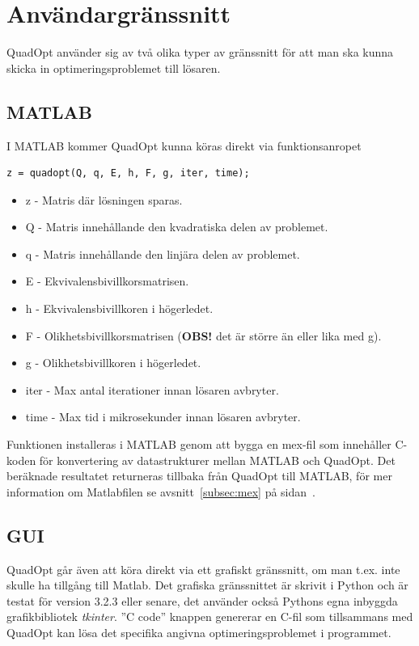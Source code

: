 \section{Användargränssnitt}
QuadOpt använder sig av två olika typer av gränssnitt för att man ska kunna skicka in optimeringsproblemet till lösaren.

\subsection{MATLAB}
I MATLAB kommer QuadOpt kunna köras direkt via funktionsanropet

\begin{lstlisting}
z = quadopt(Q, q, E, h, F, g, iter, time);
\end{lstlisting}

\begin{itemize}
	\item z - Matris där lösningen sparas.
	\item Q - Matris innehållande den kvadratiska delen av problemet.
	\item q - Matris innehållande den linjära delen av problemet.
	\item E - Ekvivalensbivillkorsmatrisen.
	\item h - Ekvivalensbivillkoren i högerledet.
	\item F - Olikhetsbivillkorsmatrisen (\textbf{OBS!} det är större än eller lika med g).
	\item g - Olikhetsbivillkoren i högerledet.
	\item iter - Max antal iterationer innan lösaren avbryter.
	\item time - Max tid i mikrosekunder innan lösaren avbryter.
\end{itemize}
Funktionen installeras i MATLAB genom att bygga en mex-fil som innehåller C-koden för konvertering av datastrukturer mellan MATLAB och QuadOpt. Det beräknade resultatet returneras tillbaka från QuadOpt till MATLAB, för mer information om Matlabfilen se avsnitt~\ref{subsec:mex} på sidan~\pageref{subsec:mex}.

\subsection{GUI}
QuadOpt går även att köra direkt via ett grafiskt gränssnitt, om man t.ex. inte skulle ha tillgång till Matlab. Det grafiska gränssnittet är skrivit i Python och är testat för version 3.2.3 eller senare, det använder också Pythons egna inbyggda grafikbibliotek \emph{tkinter}. ''C code'' knappen genererar en C-fil som tillsammans med QuadOpt kan lösa det specifika angivna optimeringsproblemet i programmet.

